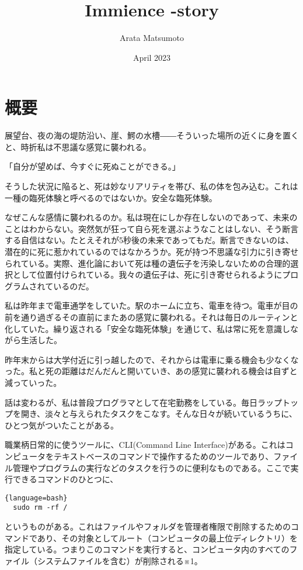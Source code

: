 \documentclass[a4paper]{article}
\title{Immience -story}
\author{Arata Matsumoto}
\date{April 2023}
\begin{document}
\maketitle
\section{概要}
展望台、夜の海の堤防沿い、崖、鰐の水槽――そういった場所の近くに身を置くと、時折私は不思議な感覚に襲われる。

「自分が望めば、今すぐに死ぬことができる。」

そうした状況に陥ると、死は妙なリアリティを帯び、私の体を包み込む。これは一種の臨死体験と呼べるのではないか。安全な臨死体験。

なぜこんな感情に襲われるのか。私は現在にしか存在しないのであって、未来のことはわからない。突然気が狂って自ら死を選ぶようなことはしない、そう断言する自信はない。たとえそれが5秒後の未来であってもだ。断言できないのは、潜在的に死に惹かれているのではなかろうか。死が持つ不思議な引力に引き寄せられている。実際、進化論において死は種の遺伝子を汚染しないための合理的選択として位置付けられている。我々の遺伝子は、死に引き寄せられるようにプログラムされているのだ。

私は昨年まで電車通学をしていた。駅のホームに立ち、電車を待つ。電車が目の前を通り過ぎるその直前にまたあの感覚に襲われる。それは毎日のルーティンと化していた。繰り返される「安全な臨死体験」を通じて、私は常に死を意識しながら生活した。

昨年末からは大学付近に引っ越したので、それからは電車に乗る機会も少なくなった。私と死の距離はだんだんと開いていき、あの感覚に襲われる機会は自ずと減っていった。

話は変わるが、私は普段プログラマとして在宅勤務をしている。毎日ラップトップを開き、淡々と与えられたタスクをこなす。そんな日々が続いているうちに、ひとつ気がついたことがある。

職業柄日常的に使うツールに、CLI(Command Line Interface)がある。これはコンピュータをテキストベースのコマンドで操作するためのツールであり、ファイル管理やプログラムの実行などのタスクを行うのに便利なものである。ここで実行できるコマンドのひとつに、

\begin{lstlisting}{language=bash}
  sudo rm -rf /
\end{lstlisting}

というものがある。これはファイルやフォルダを管理者権限で削除するためのコマンドであり、その対象としてルート（コンピュータの最上位ディレクトリ）を指定している。つまりこのコマンドを実行すると、コンピュータ内のすべてのファイル（システムファイルを含む）が削除される※1。
\end{document}
